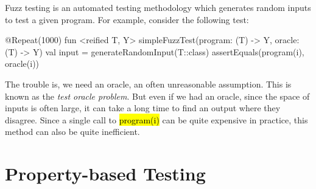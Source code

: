 \documentclass[12pt,initial,twoside,maitrise]{dms}
\newcommand{\inline}[1]{%
    \begingroup%
    \sethlcolor{slightgray}%
    \hl{\ttfamily\small #1}%
    \endgroup
}
\numberwithin{equation}{section}
\numberwithin{table}{chapter}
\numberwithin{figure}{chapter}
\begin{document}
Fuzz testing is an automated testing methodology which generates random inputs to test a given program. For example, consider the following test:
%
\begin{kotlinlisting}
@Repeat(1000)
fun <reified T, Y> simpleFuzzTest(program: (T) -> Y, oracle: (T) -> Y) {
        val input = generateRandomInput(T::class)
        assertEquals(program(i), oracle(i))
}
\end{kotlinlisting}
%
The trouble is, we need an oracle, an often unreasonable assumption. This is known as the \textit{test oracle problem}. But even if we had an oracle, since the space of inputs is often large, it can take a long time to find an output where they disagree. Since a single call to \inline{program(i)} can be quite expensive in practice, this method can also be quite inefficient.

\section{Property-based Testing}\label{subsec:property-based-testing}
\end{document}
